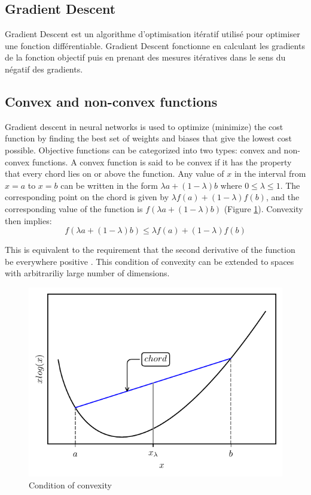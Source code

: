 \subsection{Gradient Descent}
Gradient Descent est un algorithme d'optimisation itératif utilisé pour optimiser une fonction différentiable. Gradient Descent fonctionne en calculant les gradients de la fonction objectif puis en prenant des mesures itératives dans le sens du négatif des gradients.

\subsection{Convex and non-convex functions}
Gradient descent in neural networks is used to optimize (minimize) the cost function by finding the best set of weights and biases that give the lowest cost possible. Objective functions can be categorized into two types: convex and non-convex functions.
A convex function is said to be convex if it has the property that every chord lies on or above the function. Any value of $x$ in the interval from $x=a$ to $x=b$ can be written in the form $\lambda a+(1-\lambda)b$ where $0\leq\lambda\leq 1$. The corresponding point on the chord is given by $\lambda f(a)+(1-\lambda)f(b)$, and the corresponding value of the function is $f(\lambda a+(1-\lambda)b)$ (Figure \ref{fig:convexity}). Convexity then implies:
\begin{equation}
    f(\lambda a+(1-\lambda)b)\leq \lambda f(a)+(1-\lambda)f(b)
    \label{equation:convexity}
\end{equation}

This is equivalent to the requirement that the second derivative of the function be everywhere positive \cite{Bishop2006}. This condition of convexity can be extended to spaces with arbitrariliy large number of dimensions.

\begin{figure}[h]
    \centering
    \includegraphics{figures/convex_function.pdf}
    \caption{Condition of convexity}
    \label{fig:convexity}
\end{figure}

